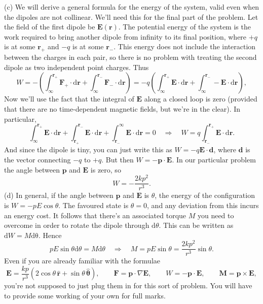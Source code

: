 \documentclass[../TST.tex]{subfiles}
\begin{document}
\begin{solution}
(c) We will derive a general formula for the energy of the system, valid even when the dipoles are not collinear. We'll need this for the final part of the problem. Let the field of the first dipole be $\mathbf{E}(\mathbf{r})$. The potential energy of the system is the work required to bring another dipole from infinity to its final position, where $+q$ is at some $\mathbf{r_+}$ and $-q$ is at some $\mathbf{r_-}$. This energy does not include the interaction between the charges in each pair, so there is no problem with treating the second dipole as two independent point charges. Thus
\begin{equation*}
W=-\left(\int_\infty^\mathbf{r_+}\mathbf{F_+}\cdot \mathrm{d}\mathbf{r}+\int_\infty^\mathbf{r_-}\mathbf{F_-}\cdot \mathrm{d}\mathbf{r}\right)=-q\left(\int_\infty^\mathbf{r_+}\mathbf{E}\cdot \mathrm{d}\mathbf{r}+\int_\infty^\mathbf{r_-}-\mathbf{E}\cdot \mathrm{d}\mathbf{r}\right),
\end{equation*}
Now we'll use the fact that the integral of $\mathbf{E}$ along a closed loop is zero (provided that there are no time-dependent magnetic fields, but we're in the clear). In particular,
\begin{equation*}
\int_\infty^\mathbf{r_+}\mathbf{E}\cdot \mathrm{d}\mathbf{r}+\int_\mathbf{r_+}^\mathbf{r_-}\mathbf{E}\cdot \mathrm{d}\mathbf{r}+\int_\mathbf{r_-}^\infty\mathbf{E}\cdot \mathrm{d}\mathbf{r}=0 \quad\Rightarrow\quad W=q\int_\mathbf{r_-}^\mathbf{r_+}\mathbf{E}\cdot \mathrm{d}\mathbf{r}
.
\end{equation*}
And since the dipole is tiny, you can just write this as $W=-q\mathbf{E}\cdot \mathbf{d}$, where $\mathbf{d}$ is the vector connecting $-q$ to $+q$. But then $W=-\mathbf{p}\cdot \mathbf{E}$.
In our particular problem the angle between $\mathbf{p}$ and $\mathbf{E}$ is zero, so 
\begin{equation*}
\boxed{W=-\frac{2kp^2}{r^3}.}
\end{equation*}
(d) In general, if the angle between $\mathbf{p}$ and $\mathbf{E}$ is $\theta$, the energy of the configuration is $W=-pE\cos{\theta}$. The favoured state is $\theta = 0$, and any deviation from this incurs an energy cost. It follows that there's an associated torque $M$ you need to overcome in order to rotate the dipole through $\mathrm{d}\theta$. This can be written as $\mathrm{d}W=M \mathrm{d}\mathrm{\theta}$. Hence
\begin{equation*}
	pE\sin{\theta}\mathrm{d}\theta=M\mathrm{d}\theta \quad\Rightarrow\quad M=pE\sin\theta=\boxed{\frac{2kp^2}{r^3}\sin{\theta}.}
\end{equation*}
Even if you are already familiar with the formulae
\begin{equation*}
	\mathbf{E}=\frac{k p}{ r^3}\left(2\cos{\theta \,\boldsymbol{\hat{r}}+\sin{\theta}\,\boldsymbol{\hat{\theta}}}\right),\quad\quad 
	\mathbf{F}=\mathbf{p}\cdot \nabla \mathbf{E},\quad\quad
	W=-\mathbf{p}\cdot \mathbf{E},\quad\quad
	\mathbf{M}=\mathbf{p}\times\mathbf{E},
\end{equation*}
you're not supposed to just plug them in for this sort of problem. You will have to provide some working of your own for full marks.

\end{solution}
\fi
\end{document}
